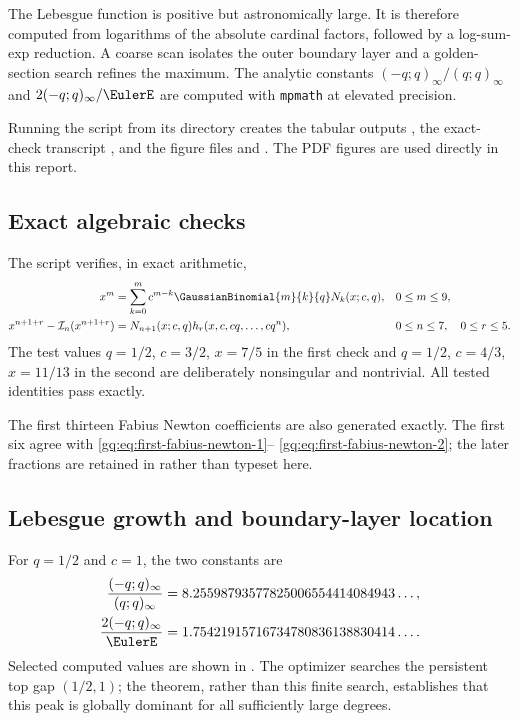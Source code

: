 The Lebesgue function is positive but astronomically large.  It is therefore
computed from logarithms of the absolute cardinal factors, followed by a
log-sum-exp reduction.  A coarse scan isolates the outer boundary layer and
a golden-section search refines the maximum.  The analytic constants
$(-q;q)_\infty/(q;q)_\infty$ and $2(-q;q)_\infty/\EulerE$ are computed with
\texttt{mpmath} at elevated precision.

Running the script from its directory creates the tabular outputs
, the exact-check transcript
, and the figure files
 and .  The PDF figures are used
directly in this report.

\subsection{Exact algebraic checks}

The script verifies, in exact arithmetic,
\begin{align}
 x^m&=\sum_{k=0}^{m}c^{m-k}\GaussianBinomial{m}{k}{q}N_k(x;c,q),
 &&0\le m\le9,
 \label{gq:eq:numeric-check-basis}\\
 x^{n+1+r}-\Interp_n(x^{n+1+r})
 &=N_{n+1}(x;c,q)h_r(x,c,cq,\ldots,cq^n),
 &&0\le n\le7,
 \quad0\le r\le5.
 \label{gq:eq:numeric-check-residual}
\end{align}
The test values $q=1/2$, $c=3/2$, $x=7/5$ in the first check and
$q=1/2$, $c=4/3$, $x=11/13$ in the second are deliberately nonsingular and
nontrivial.  All tested identities pass exactly.

The first thirteen Fabius Newton coefficients are also generated exactly.
The first six agree with \eqref{gq:eq:first-fabius-newton-1}--
\eqref{gq:eq:first-fabius-newton-2}; the later fractions are retained in
 rather than typeset here.

\subsection{Lebesgue growth and boundary-layer location}

For $q=1/2$ and $c=1$, the two constants are
\begin{align}
 \frac{(-q;q)_\infty}{(q;q)_\infty}
 &=8.25598793577825006554414084943\ldots,
 \label{gq:eq:numeric-endpoint-constant}\\
 \frac{2(-q;q)_\infty}{\EulerE}
 &=1.75421915716734780836138830414\ldots.
 \label{gq:eq:numeric-global-prefactor}
\end{align}
Selected computed values are shown in .  The
optimizer searches the persistent top gap $(1/2,1)$; the theorem, rather
than this finite search, establishes that this peak is globally dominant for
all sufficiently large degrees.

